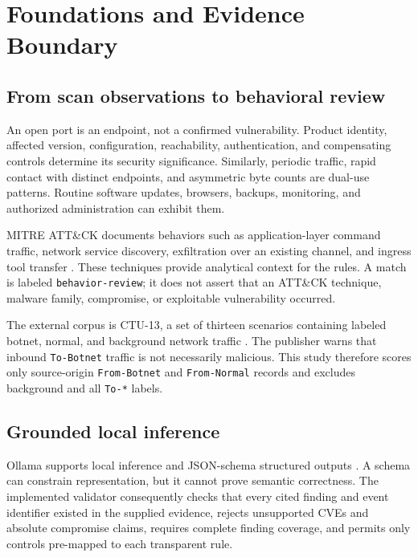 \documentclass[11pt,a4paper,onecolumn]{IEEEtran}
\begin{document}
\section{Foundations and Evidence Boundary}

\subsection{From scan observations to behavioral review}

An open port is an endpoint, not a confirmed vulnerability. Product identity, affected version, configuration, reachability, authentication, and compensating controls determine its security significance. Similarly, periodic traffic, rapid contact with distinct endpoints, and asymmetric byte counts are dual-use patterns. Routine software updates, browsers, backups, monitoring, and authorized administration can exhibit them.

MITRE ATT\&CK documents behaviors such as application-layer command traffic, network service discovery, exfiltration over an existing channel, and ingress tool transfer \cite{mitre2025}. These techniques provide analytical context for the rules. A match is labeled \texttt{behavior-review}; it does not assert that an ATT\&CK technique, malware family, compromise, or exploitable vulnerability occurred.

The external corpus is CTU-13, a set of thirteen scenarios containing labeled botnet, normal, and background network traffic \cite{garcia2014ctu13,ctu13dataset2026}. The publisher warns that inbound \texttt{To-Botnet} traffic is not necessarily malicious. This study therefore scores only source-origin \texttt{From-Botnet} and \texttt{From-Normal} records and excludes background and all \texttt{To-*} labels.

\subsection{Grounded local inference}

Ollama supports local inference and JSON-schema structured outputs \cite{ollama2025,ollamastructured2026}. A schema can constrain representation, but it cannot prove semantic correctness. The implemented validator consequently checks that every cited finding and event identifier existed in the supplied evidence, rejects unsupported CVEs and absolute compromise claims, requires complete finding coverage, and permits only controls pre-mapped to each transparent rule.
\end{document}

